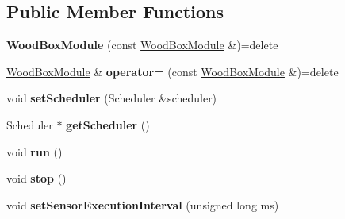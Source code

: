 \subsection*{Public Member Functions}
\begin{DoxyCompactItemize}
\item 
\mbox{\label{classwood_box_1_1module_1_1_wood_box_module_ade3d82ff1e508da2ad37185c208f9333}} 
{\bfseries Wood\+Box\+Module} (const \mbox{\hyperlink{classwood_box_1_1module_1_1_wood_box_module}{Wood\+Box\+Module}} \&)=delete
\item 
\mbox{\label{classwood_box_1_1module_1_1_wood_box_module_acdae18f8e9e685cdbce5a4fc99956ab3}} 
\mbox{\hyperlink{classwood_box_1_1module_1_1_wood_box_module}{Wood\+Box\+Module}} \& {\bfseries operator=} (const \mbox{\hyperlink{classwood_box_1_1module_1_1_wood_box_module}{Wood\+Box\+Module}} \&)=delete
\item 
\mbox{\label{classwood_box_1_1module_1_1_wood_box_module_a71289d760332ef4945ceb4b95f2e616e}} 
void {\bfseries set\+Scheduler} (Scheduler \&scheduler)
\item 
\mbox{\label{classwood_box_1_1module_1_1_wood_box_module_a08e0f7b37441c9fa9ba51ab1da21e1c0}} 
Scheduler $\ast$ {\bfseries get\+Scheduler} ()
\item 
\mbox{\label{classwood_box_1_1module_1_1_wood_box_module_ac65e58ab2338b1e3f57e4ce5d9e70c6c}} 
void {\bfseries run} ()
\item 
\mbox{\label{classwood_box_1_1module_1_1_wood_box_module_abbc32e89fe1ace40f447539237c0b713}} 
void {\bfseries stop} ()
\item 
\mbox{\label{classwood_box_1_1module_1_1_wood_box_module_aa5e44c8631ee30e85c16ffc0454c8210}} 
void {\bfseries set\+Sensor\+Execution\+Interval} (unsigned long ms)
\item 
\mbox{\label{classwood_box_1_1module_1_1_wood_box_module_a0242f49765460d7c1e0528260ba1c26e}} 

\end{DoxyCompactItemize}
